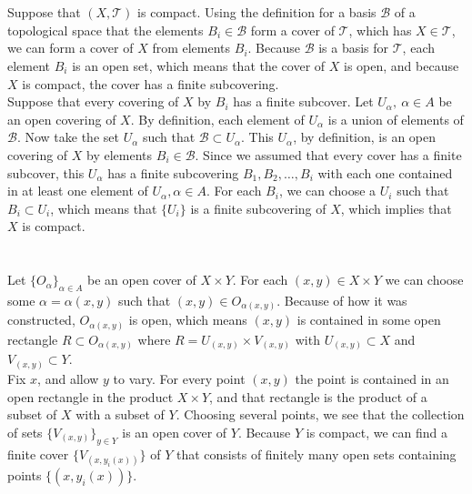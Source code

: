 \documentclass{jhwhw}
\newcommand{\T}{{\mathcal T}}
\newcommand{\B}{{\mathcal B}}
\begin{document}
\part{}%

Suppose that $(X,\T)$ is compact. Using the definition for a basis $\B$ of a topological space that the elements $B_i \in \B$ form a cover of $\T$, which has $X \in \T$, we can form a cover of $X$ from elements $B_i$. Because $\B$ is a basis for $\T$, each element $B_i$ is an open set, which means that the cover of $X$ is open, and because $X$ is compact, the cover has a finite subcovering.
\\

Suppose that every covering of $X$ by $B_i$ has a finite subcover. Let  $U_{\alpha}, \ \alpha \in A$ be an open covering of $X$.  By definition, each element of $U_{\alpha}$ is a union of elements of $\B$. Now take the set $U_{\alpha}$ such that $\B \subset U_{\alpha}$. This $U_{\alpha}$, by definition, is an open covering of $X$ by elements $B_i \in \B$.  Since we assumed that every cover has a finite subcover, this $U_{\alpha}$ has a finite subcovering $B_1,B_2, \dots, B_i$ with each one contained in at least one element of $U_{\alpha}, \alpha \in A$. For each $B_i$, we can choose a $U_i$ such that $B_i \subset U_i$, which means that $\{U_i\}$ is a finite subcovering of $X$, which implies that $X$ is compact.

\part{}%

Let $\{O_{\alpha}\}_{\alpha \in A}$ be an open cover of $X \times Y$. For each $(x,y) \in X\times Y$ we can choose some $\alpha=\alpha(x,y)$ such that $(x,y) \in O_{\alpha(x,y)}$. Because of how it was constructed, $O_{\alpha(x,y)}$ is open, which means $(x,y)$ is contained in some open rectangle $R \subset O_{\alpha(x,y)}$ where $R = U_{(x,y)} \times V_{(x,y)}$ with $U_{(x,y)} \subset X$ and $V_{(x,y)} \subset Y$.  
\\

Fix $x$, and allow $y$ to vary. For every point $(x,y)$ the point is contained in an open rectangle in the product $X \times Y$, and that rectangle is the product of a subset of $X$ with a subset of $Y$. Choosing several points, we see that the collection of sets $\{V_{(x,y)}\}_{y \in Y}$ is an open cover of $Y$. Because $Y$ is compact, we can find a finite cover $\{V_{(x,y_i(x))}\}$ of $Y$ that consists of finitely many open sets containing points $\{(x,y_i(x))\}$.
\\
\end{document}
